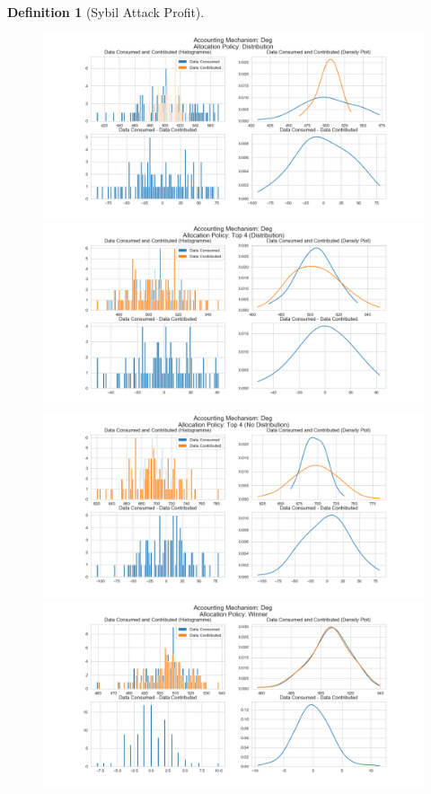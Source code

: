 \documentclass[11pt,a4paper]{report}
\theoremstyle{definition}
\newtheorem{definition}{Definition}[section]
\theoremstyle{theorem}
\theoremstyle{proposition}
\theoremstyle{corollary}
\theoremstyle{lemma}
\theoremstyle{example}
\theoremstyle{remark}
\begin{document}
\begin{definition}[Sybil Attack Profit]
\begin{figure}[H]
\begin{center}
\includegraphics[scale=0.4]{Acc_Deg_Dist.png}
\includegraphics[scale=0.4]{Acc_Deg_Top_4_Dist.png}
\includegraphics[scale=0.4]{Acc_Deg_Top_4_No_Dist.png}
\includegraphics[scale=0.4]{Acc_Deg_Winner.png}
\end{center}
\end{figure}


\end{definition}
\end{document}
